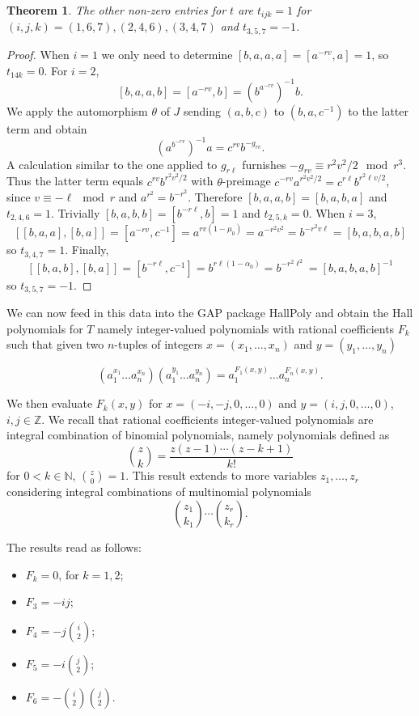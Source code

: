\documentclass{amsart}
\newtheorem{theorem}{Theorem}[section]
\theoremstyle{definition}
\theoremstyle{remark}
\newcommand \Z{{\mathbb Z}}
\newcommand \N{{\mathbb N}}
\begin{document}
{\begin{theorem}\label{T:tcoeffs}
  The other non-zero entries for $t$ are $t_{ijk}=1$ for $(i,j,k)=(1,6,7),(2,4,6),(3,4,7)$ and $t_{3,5,7}=-1$.
\end{theorem}

\begin{proof}
  When $i=1$ we only need to determine $[b,a,a,a]=[a^{-rv},a]=1$, so $t_{14k}=0$. For $i=2$, 
  $$
  [b,a,a,b]=[a^{-rv},b]=(b^{a^{-rv}})^{-1}b.
  $$
We apply the automorphism $\theta$ of $J$ sending $(a,b,c)$ to $(b,a,c^{-1})$ to the latter term and obtain
$$
(a^{b^{-rv}})^{-1}a=c^{rv}b^{-g_{rv}}.
$$
A calculation similar to the one applied to $g_{r\ell}$ furnishes $-g_{rv}\equiv r^2v^2/2\mod r^3$.
Thus the latter term equals $c^{rv}b^{r^2v^2/2}$ with $\theta$-preimage
$c^{-rv}a^{r^2v^2/2}=c^{r\ell}b^{r^2\ell v/2}$, since $v\equiv-\ell\mod r$ and $a^{r^2}=b^{-r^2}$.
Therefore $[b,a,a,b]=[b,a,b,a]$ and $t_{2,4,6}=1$.
Trivially $[b,a,b,b]=[b^{-r\ell},b]=1$ and $t_{2,5,k}=0$.
When $i=3$,
$$
[[b,a,a],[b,a]]=[a^{-rv},c^{-1}]=a^{rv(1-\mu_0)}=a^{-r^2v^2}=b^{-r^2v\ell}=[b,a,b,a,b]
$$
so $t_{3,4,7}=1$. Finally,
$$
[[b,a,b],[b,a]]=[b^{-r\ell},c^{-1}]=b^{r\ell(1-\alpha_0)}=b^{-r^2\ell^2}=[b,a,b,a,b]^{-1}
$$ so $t_{3,5,7}=-1$.
\end{proof}

We can now feed in this data into the GAP package HallPoly and obtain the Hall polynomials for $T$
namely integer-valued polynomials with rational coefficients $F_k$ such that given two $n$-tuples of integers
$x=(x_1,\ldots,x_n)$ and $y=(y_1,\ldots,y_n)$

\begin{equation}\label{E:HallPol}
  (a_1^{x_1}\ldots a_n^{x_n})(a_1^{y_1}\ldots a_n^{y_n})=a_1^{F_1(x,y)}\ldots a_n^{F_n(x,y)}.
\end{equation}

We then evaluate $F_k(x,y)$ for $x=(-i,-j,0,\ldots,0)$ and $y=(i,j,0,\ldots,0)$, $i,j\in\Z$.
We recall that rational coefficients integer-valued polynomials are integral combination of binomial polynomials, namely polynomials defined as
$$
\binom{z}{k}=\frac{z(z-1)\cdots(z-k+1)}{k!}
$$
for $0<k\in \N$, $\binom{z}{0}=1$. This result extends to more variables $z_1,\ldots,z_r$ considering integral combinations of multinomial polynomials 
$$
\binom{z_1}{k_1}\cdots\binom{z_r}{k_r}.
$$

The results read as follows:
\begin{itemize}
  \item $F_k=0$, for $k=1,2$;
  \item $F_3=-ij$;
  \item $F_4=-j\binom{i}{2}$;
  \item $F_5=-i\binom{j}{2}$;
  \item $F_6=-\binom{i}{2}\binom{j}{2}$.
\end{itemize}

}
\end{document}
